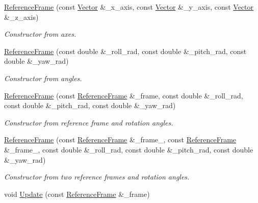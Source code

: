 \begin{DoxyCompactItemize}
\item 
\hyperlink{classosse_1_1collaborate_1_1_reference_frame_aa7a87b7392e85b87cf0994457f0b5b6a}{Reference\+Frame} (const \hyperlink{classosse_1_1collaborate_1_1_vector}{Vector} \&\+\_\+x\+\_\+axis, const \hyperlink{classosse_1_1collaborate_1_1_vector}{Vector} \&\+\_\+y\+\_\+axis, const \hyperlink{classosse_1_1collaborate_1_1_vector}{Vector} \&\+\_\+z\+\_\+axis)
\begin{DoxyCompactList}\small\item\em Constructor from axes. \end{DoxyCompactList}\item 
\hyperlink{classosse_1_1collaborate_1_1_reference_frame_ab6e3506c308d48e033730fa71c3721af}{Reference\+Frame} (const double \&\+\_\+roll\+\_\+rad, const double \&\+\_\+pitch\+\_\+rad, const double \&\+\_\+yaw\+\_\+rad)
\begin{DoxyCompactList}\small\item\em Constructor from angles. \end{DoxyCompactList}\item 
\hyperlink{classosse_1_1collaborate_1_1_reference_frame_a09500c8f97064fa3d907913e26f2df90}{Reference\+Frame} (const \hyperlink{classosse_1_1collaborate_1_1_reference_frame}{Reference\+Frame} \&\+\_\+frame, const double \&\+\_\+roll\+\_\+rad, const double \&\+\_\+pitch\+\_\+rad, const double \&\+\_\+yaw\+\_\+rad)
\begin{DoxyCompactList}\small\item\em Constructor from reference frame and rotation angles. \end{DoxyCompactList}\item 
\hyperlink{classosse_1_1collaborate_1_1_reference_frame_a603c3443d0d09086de9e95cd69b62ea5}{Reference\+Frame} (const \hyperlink{classosse_1_1collaborate_1_1_reference_frame}{Reference\+Frame} \&\+\_\+frame\+\_, const \hyperlink{classosse_1_1collaborate_1_1_reference_frame}{Reference\+Frame} \&\+\_\+frame\+\_, const double \&\+\_\+roll\+\_\+rad, const double \&\+\_\+pitch\+\_\+rad, const double \&\+\_\+yaw\+\_\+rad)
\begin{DoxyCompactList}\small\item\em Constructor from two reference frames and rotation angles. \end{DoxyCompactList}\item 
void \hyperlink{classosse_1_1collaborate_1_1_reference_frame_a0d731be5e188825229a59440eea5341e}{Update} (const \hyperlink{classosse_1_1collaborate_1_1_reference_frame}{Reference\+Frame} \&\+\_\+frame)

\end{DoxyCompactItemize}
